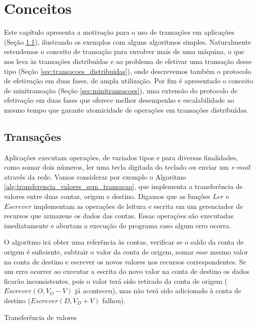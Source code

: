 \documentclass[11pt,twoside,a4paper]{book}
\begin{document}
\chapter{Conceitos}
\label{chap:conceitos}
Este capítulo apresenta a motivação para o uso de transações em aplicações
(Seção \ref{sec:transacoes}), ilustrando os exemplos com alguns algoritmos
simples.
Naturalmente estendemos o conceito de transação para envolver mais de uma
máquina, o que nos leva às transações distribuídas e ao problema de efetivar uma
transação desse tipo (Seção \ref{sec:transacoes_distribuidas}), onde descrevemos
também o protocolo de efetivação em duas fases, de ampla utilização. Por fim é
apresentado o conceito de minitransação (Seção \ref{sec:minitransacoes}), uma extensão do protocolo de efetivação em duas fases que oferece melhor
desempenho e escalabilidade ao mesmo tempo que garante atomicidade de operações
em transações distribuídas.

\section{Transações}
\label{sec:transacoes}
Aplicações executam operações, de variados tipos e para diversas finalidades, como somar dois números, ler uma tecla digitada do teclado ou enviar um \emph{e-mail} através da rede. Vamos considerar por exemplo o Algoritmo \ref{alg:transferencia_valores_sem_transacao}, que implementa a transferência de valores entre duas contas, origem e destino. Digamos que as funções $Ler$ e $Escrever$ implementam as operações de leitura e escrita em um gerenciador de recursos que armazene os dados das contas. Essas operações são executadas imediatamente e abortam a execução do programa caso algum erro ocorra.

O algoritmo irá obter uma referência às contas, verificar se o saldo da conta de origem é suficiente, subtrair o valor da conta de origem, somar esse mesmo valor na conta de destino e escrever os novos valores nos recursos correspondentes. Se um erro ocorrer ao executar a escrita do novo valor na conta de destino os dados ficarão inconsistentes, pois o valor terá sido retirado da conta de origem ($Escrever(O, V_O - V)$ já aconteceu), mas não terá sido adicionado à conta de destino ($Escrever(D, V_D + V)$ falhou).

\begin{algorithm}
\caption{Transferência de valores}
\label{alg:transferencia_valores_sem_transacao}
\end{algorithm}
\end{document}
